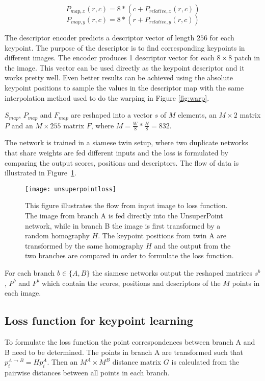 \[
P_{map,x}(r,c) = 8 * (c + P_{relative,x}(r,c))
\]
\[
P_{map,y}(r,c) = 8 * (r + P_{relative,y}(r,c))
\]

The descriptor encoder predicts a descriptor vector of length $256$ for each keypoint. The purpose of the descriptor is to find corresponding keypoints in different images. The encoder produces 1 descriptor vector for each $8\times 8$ patch in the image. This vector can be used directly as the keypoint descriptor and it works pretty well. Even better results can be achieved using the absolute keypoint positions to sample the values in the descriptor map with the same interpolation method used to do the warping in Figure \ref{fig:warp}.

$S_{map}$, $P_{map}$ and $F_{map}$ are reshaped into a vector $s$ of $M$ elements, an $M\times 2$ matrix $P$ and an $M\times 255$ matrix $F$, where $M=\frac{W}{8}*\frac{H}{8}=832$.

The network is trained in a siamese twin setup, where two duplicate networks that share weights are fed different inputs and the loss is formulated by comparing the output scores, positions and descriptors. The flow of data is illustrated in Figure~\ref{fig:unsuperpointloss}.

\begin{figure}[H]
	\centering
	\texttt{[image: unsuperpointloss]}
	\caption{This figure illustrates the flow from input image to loss function. The image from branch A is fed directly into the UnsuperPoint network, while in branch B the image is first transformed by a random homography $H$. The keypoint positions from twin A are transformed by the same homography $H$ and the output from the two branches are compared in order to formulate the loss function.}
	\label{fig:unsuperpointloss}
\end{figure}

For each branch $b\in\{A,B\}$ the siamese networks output the reshaped matrices $s^b$, $P^b$ and $F^b$ which contain the scores, positions and descriptors of the $M$ points in each image.

\subsection{Loss function for keypoint learning}\label{sec:keypointloss}

To formulate the loss function the point correspondences between branch A and B need to be determined. The points in branch A are transformed such that $p_i^{A\rightarrow B}=Hp_i^A$. Then an $M^A\times M^B$ distance matrix $G$ is calculated from the pairwise distances between all points in each branch.

